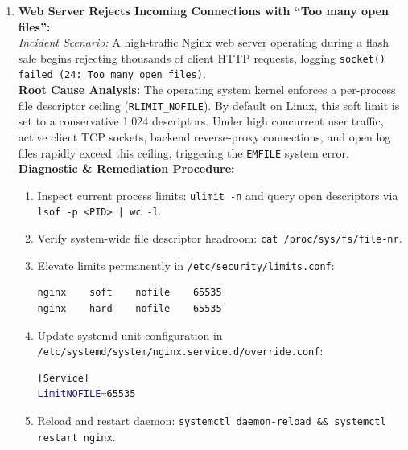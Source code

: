 \begin{enumerate}[label=\textbf{Case \arabic*.},leftmargin=1.5cm]
\item \textbf{Web Server Rejects Incoming Connections with ``Too many open files'':} \\
\textit{Incident Scenario:} A high-traffic Nginx web server operating during a flash sale begins rejecting thousands of client HTTP requests, logging \texttt{socket() failed (24: Too many open files)}. \\
\textbf{Root Cause Analysis:} The operating system kernel enforces a per-process file descriptor ceiling (\texttt{RLIMIT\_NOFILE}). By default on Linux, this soft limit is set to a conservative 1,024 descriptors. Under high concurrent user traffic, active client TCP sockets, backend reverse-proxy connections, and open log files rapidly exceed this ceiling, triggering the \texttt{EMFILE} system error. \\
\textbf{Diagnostic \& Remediation Procedure:}
\begin{enumerate}
    \item Inspect current process limits: \texttt{ulimit -n} and query open descriptors via \texttt{lsof -p <PID> | wc -l}.
    \item Verify system-wide file descriptor headroom: \texttt{cat /proc/sys/fs/file-nr}.
    \item Elevate limits permanently in \texttt{/etc/security/limits.conf}:
\begin{lstlisting}[language=bash]
nginx    soft    nofile    65535
nginx    hard    nofile    65535
\end{lstlisting}
    \item Update systemd unit configuration in \texttt{/etc/systemd/system/nginx.service.d/override.conf}:
\begin{lstlisting}[language=bash]
[Service]
LimitNOFILE=65535
\end{lstlisting}
    \item Reload and restart daemon: \texttt{systemctl daemon-reload \&\& systemctl restart nginx}.

\end{enumerate}


\end{enumerate}
